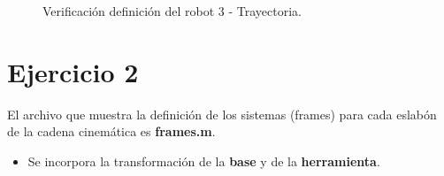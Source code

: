 \documentclass[a4paper,12pt]{article}
\begin{document}
\begin{figure}[H]
    \centering
    \begin{adjustbox}{scale = 0.45, max width=\columnwidth}
    \end{adjustbox}
    \caption{Verificación definición del robot 3 - Trayectoria.}
\end{figure}

\section{Ejercicio 2}
El archivo que muestra la definición de los sistemas (frames) para cada eslabón de la cadena
cinemática es \textbf{frames.m}.

\begin{itemize}
    \item Se incorpora la transformación de la \textbf{base} y de la \textbf{herramienta}.
\end{itemize}
\end{document}
